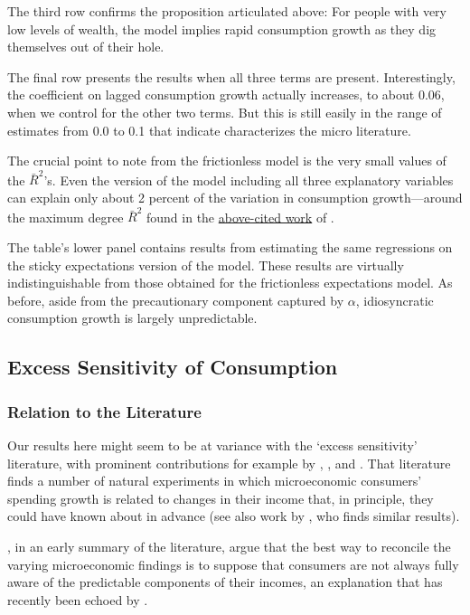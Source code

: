 \documentclass[titlepage]{./econtex}
\begin{document}
The third row confirms the proposition articulated above: For people with very low levels of wealth, the model implies rapid consumption growth as they dig themselves out of their hole.

The final row presents the results when all three terms are present.  Interestingly, the coefficient on lagged consumption growth actually increases, to about 0.06, when we control for the other two terms.  But this is still easily in the range of estimates from 0.0 to 0.1 that \cite{hrsHabit} indicate characterizes the micro literature.

The crucial point to note from the frictionless model is the very small values of the $\bar{R}^{2}$'s.  Even the version of the model including all three explanatory variables can explain only about 2 percent of the variation in consumption growth---around the maximum degree $\bar{R}^{2}$ found in the \hyperlink{dynanR2}{above-cited work} of \cite{dynanHabits}.

The table's lower panel contains results from estimating the same regressions on the sticky expectations version of the model.  These results are virtually indistinguishable from those obtained for the frictionless expectations model.  As before, aside from the precautionary component captured by $\alpha$, idiosyncratic consumption growth is largely unpredictable.



\subsection{Excess Sensitivity of Consumption} \label{sec:ExcessSens}

\subsubsection{Relation to the Literature}

Our results here might seem to be at variance with the `excess sensitivity' literature, with prominent contributions for example by \cite{soulelesTaxRefunds}, \cite{jpsTax}, and \cite{psjmMPC2008}.  That literature finds a number of natural experiments in which microeconomic consumers' spending growth is related to changes in their income that, in principle, they could have known about in advance (see also work by \cite{kuengTaxnews}, who finds similar results).

\cite{BrowningColladoAER}, in an early summary of the literature, argue that the best way to reconcile the varying microeconomic findings is to suppose that consumers are not always fully aware of the predictable components of their incomes, an explanation that has recently been echoed by \cite{parker25million}.
\end{document}
